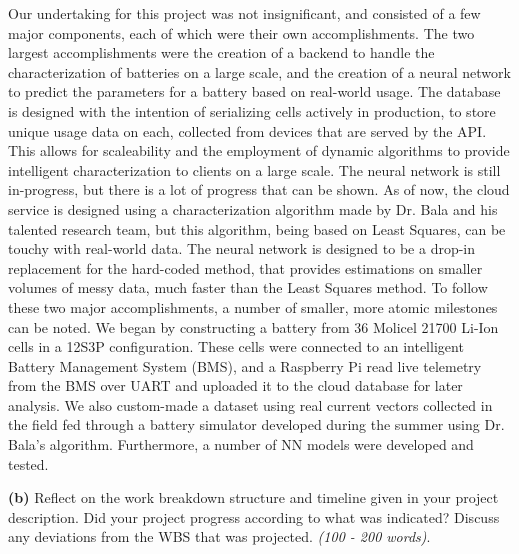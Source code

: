 \documentclass{article}
\begin{document}
\begin{singlespace}
    \fontsize{10}{12}\selectfont
    Our undertaking for this project was not insignificant, and consisted of a few major components, each of which were their own accomplishments. The two largest accomplishments were the creation of a backend to handle the characterization of batteries on a large scale, and the creation of a neural network to predict the parameters for a battery based on real-world usage. The database is designed with the intention of serializing cells actively in production, to store unique usage data on each, collected from devices that are served by the API. This allows for scaleability and the employment of dynamic algorithms to provide intelligent characterization to clients on a large scale. The neural network is still in-progress, but there is a lot of progress that can be shown. As of now, the cloud service is designed using a characterization algorithm made by Dr. Bala and his talented research team, but this algorithm, being based on Least Squares, can be touchy with real-world data. The neural network is designed to be a drop-in replacement for the hard-coded method, that provides estimations on smaller volumes of messy data, much faster than the Least Squares method. To follow these two major accomplishments, a number of smaller, more atomic milestones can be noted. We began by constructing a battery from 36 Molicel 21700 Li-Ion cells in a 12S3P configuration. These cells were connected to an intelligent Battery Management System (BMS), and a Raspberry Pi read live telemetry from the BMS over UART and uploaded it to the cloud database for later analysis. We also custom-made a dataset using real current vectors collected in the field fed through a battery simulator developed during the summer using Dr. Bala's algorithm. Furthermore, a number of NN models were developed and tested.
\end{singlespace}

\vspace{0.5cm}

\textbf{(b)} Reflect on the work breakdown structure and timeline given in your project description. Did your project progress according to what was indicated? Discuss any deviations from the WBS that was projected. \textit{(100 - 200 words)}.

\vspace{0.5cm}
\end{document}
